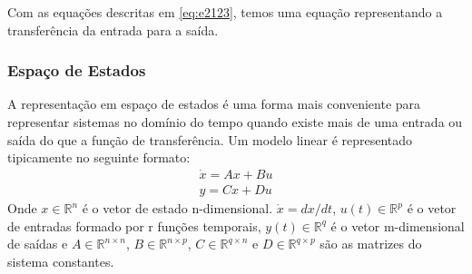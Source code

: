 Com as equações descritas em \eqref{eq:e2123}, temos uma equação representando a transferência da entrada para a saída.
\subsubsection{Espaço de Estados}
A representação em espaço de estados é uma forma mais conveniente para representar sistemas no domínio do tempo quando existe mais de uma entrada ou saída do que a função de transferência. Um modelo linear é representado tipicamente no seguinte formato:
\begin{equation}\label{eq:ss}
\begin{array}{c}
\dot{x}=Ax+Bu\\
y=Cx+Du
\end{array}
\end{equation}
Onde $x \in \mathbb{R}^n$ é o vetor de estado n-dimensional. $\dot{x}=dx/dt$, $u(t) \in \mathbb{R}^p$ é o vetor de entradas formado por r funções temporais, $y(t) \in \mathbb{R}^q$ é o vetor m-dimensional de saídas e $A \in \mathbb{R}^{n\times n}$, $B \in \mathbb{R}^{n \times p}$, $C \in \mathbb{R}^{q \times n}$ e $D \in \mathbb{R} ^{q \times p}$ são as matrizes do sistema constantes.


